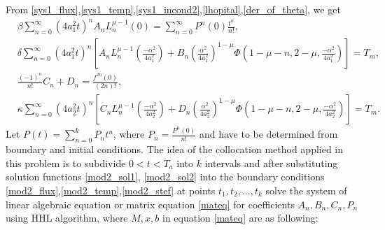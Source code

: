 \documentclass[review]{elsarticle}
\begin{document}
From \ref{sys1_flux},\ref{sys1_temp},\ref{sys1_incond2},\ref{lhopital},\ref{der_of_theta}, we get 
\begin{align}
&\beta\sum_{n=0}^\infty\left(4a_1^2t\right)^nA_nL_n^{\mu-1}(0)=\sum_{n=0}^\infty P^n(0)\frac{t^n}{n!},
\label{C_D_n1}\\
&\delta\sum_{n=0}^{\infty}\left(4a_{1}^2t\right)^{n}\left[A_nL_{n}^{\mu-1}\left( \frac{-\alpha^2}{4a_{1}^2} \right)+ B_n\left( \frac{\alpha^2}{4a_{1}^2} \right)^{1-\mu}\Phi\left(1-\mu-n, 2-\mu,\frac{-\alpha^2}{4a_{1}^2}\right)\right]=T_m,
\label{C_D_n2}\\
&\frac{(-1)^n}{n!}C_n + D_n=\frac{f^{2n}(0)}{(2n)!},
\label{C_D_n}\\
&\kappa\sum_{n=0}^{\infty}\left(4a_{2}^2t\right)^{n}\left[C_nL_{n}^{\mu-1}\left( \frac{-\alpha^2}{4a_{2}^2} \right)+ D_n\left( \frac{\alpha^2}{4a_{2}^2} \right)^{1-\mu}\Phi\left(1-\mu-n, 2-\mu,\frac{-\alpha^2}{4a_{2}^2}\right)\right]=T_m.
\label{C_D_n3}
\end{align}
Let $P(t)=\sum_{n=0}^{k}P_{n}t^n$, where $P_n=\frac{P^{n}(0)}{n!}$ and have to be determined from boundary and initial conditions. The idea of the collocation method applied in this problem is to subdivide $0<t<T_a$ into $k$ intervals and after substituting solution functions \ref{mod2_sol1}, \ref{mod2_sol2} into the boundary conditions \ref{mod2_flux},\ref{mod2_temp},\ref{mod2_stef} at points $t_1, t_2,...,t_k$ solve the system of linear algebraic equation or matrix equation \ref{mateq} for coefficients $A_n, B_n, C_n, P_n$ using HHL algorithm, where $M, x, b$ in equation \ref{mateq} are as following:
\end{document}
